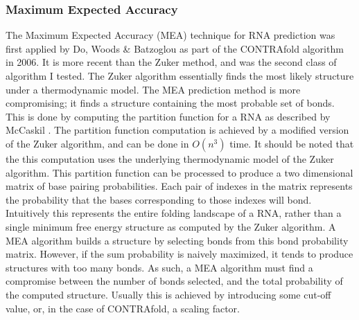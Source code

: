 \documentclass[12pt, a4paper]{article}
\begin{document}
\subsubsection{Maximum Expected Accuracy}
The Maximum Expected Accuracy (MEA) technique for RNA prediction was first applied by Do, Woods \& Batzoglou \cite{do2006contrafold} as part of the CONTRAfold algorithm in 2006. It is more recent than the Zuker method, and was the second class of algorithm I tested. The Zuker algorithm essentially finds the most likely structure under a thermodynamic model. The MEA prediction method is more compromising; it finds a structure containing the most probable set of bonds. This is done by computing the partition function for a RNA as described by McCaskil \cite{mccaskill1990equilibrium}. The partition function computation is achieved by a modified version of the Zuker algorithm, and can be done in $O(n^3)$ time. It should be noted that the this computation uses the underlying thermodynamic model of the Zuker algorithm. This partition function can be processed to produce a two dimensional matrix of base pairing probabilities. Each pair of indexes in the matrix represents the probability that the bases corresponding to those indexes will bond. Intuitively this represents the entire folding landscape of a RNA, rather than a single minimum free energy structure as computed by the Zuker algorithm. A MEA algorithm builds a structure by selecting bonds from this bond probability matrix. However, if the sum probability is naively maximized, it tends to produce structures with too many bonds. As such, a MEA algorithm must find a compromise between the number of bonds selected, and the total probability of the computed structure. Usually this is achieved by introducing some cut-off value, or, in the case of CONTRAfold, a scaling factor.
\end{document}
